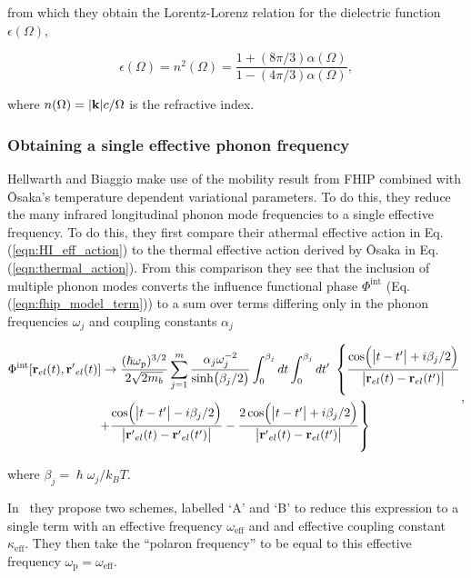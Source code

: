 from which they obtain the Lorentz-Lorenz relation for the dielectric function $\epsilon(\Omega)$,

\begin{equation}
    \epsilon(\Omega) = n^2(\Omega) = \frac{1 + (8\pi/3)\alpha(\Omega)}{1 - (4\pi/3)\alpha(\Omega)},
\end{equation}

where $n(\Omega) = \abs{\vb{k}} c / \Omega$ is the refractive index.

\subsubsection{Obtaining a single effective phonon frequency}

Hellwarth and Biaggio make use of the mobility result from FHIP combined with \=Osaka's temperature dependent variational parameters. To do this, they reduce the many infrared longitudinal phonon mode frequencies to a single effective frequency. To do this, they first compare their athermal effective action in Eq. (\ref{eqn:HI_eff_action}) to the thermal effective action derived by \=Osaka in Eq. (\ref{eqn:thermal_action}). From this comparison they see that the inclusion of multiple phonon modes converts the influence functional phase $\Phi^{\text{int}}$ (Eq. (\ref{eqn:fhip_model_term})) to a sum over terms differing only in the phonon frequencies $\omega_j$ and coupling constants $\alpha_j$

\begin{equation} \label{eqn:hellwarth_multi_action}
    \begin{gathered}
    \Phi^{\text{int}}[\vb{r}_{el}(t), \vb{r'}_{el}(t)] \rightarrow \frac{(\hslash\omega_{\text{p}})^{3/2}}{2\sqrt{2m_b}} \sum_{j=1}^m \frac{\alpha_j \omega_j^{-2}}{\sinh(\beta_j / 2)} \int^{\beta_j}_0 dt \int^{\beta_j}_0 dt'\ \left\{ \frac{\cos(\abs{t - t'} + i\beta_j / 2)}{\abs{\vb{r}_{el}(t) - \vb{r}_{el}(t')}} \right. \\
    \left. + \frac{\cos(\abs{t - t'} - i\beta_j / 2)}{\abs{\vb{r'}_{el}(t) - \vb{r'}_{el}(t')}} - \frac{2\cos(\abs{t - t'} + i\beta_j / 2)}{\abs{\vb{r'}_{el}(t) - \vb{r}_{el}(t')}} \right\}
    \end{gathered},
\end{equation}

where $\beta_j = \hslash\omega_j / k_B T$. 

In~\cite{hellwarth_mobility_1999} they propose two schemes, labelled `A' and `B' to reduce this expression to a single term with an effective frequency $\omega_{\text{eff}}$ and and effective coupling constant $\kappa_{\text{eff}}$. They then take the ``polaron frequency'' to be equal to this effective frequency $\omega_{\text{p}} = \omega_{\text{eff}}$. 

